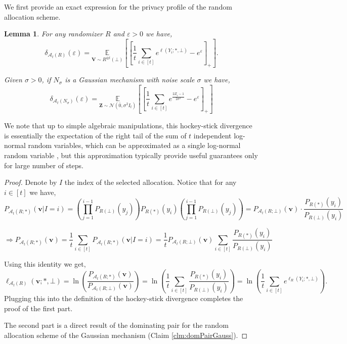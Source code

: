 \documentclass{article}
\theoremstyle{plain}
\newtheorem{lemma}[theorem]{Lemma}
\theoremstyle{definition}
\newcommand{\eps}{\varepsilon}
\newcommand{\out}{y}
\newcommand{\outRV}{Y}
\newcommand{\rand}{R}
\newcommand{\view}{\boldsymbol{v}}
\newcommand{\viewRV}{\boldsymbol{V}}
\newcommand{\expect}[2]{\underset{#1}{\mathbb{E}} \left[#2 \right]}
\newcommand{\loss}[3]{\ell\left(#1; #2, #3 \right)}
\newcommand{\lossAlg}[4]{\ell_{#1}\left(#2; #3, #4 \right)}
\newcommand{\alloc}[2]{\mathcal{A}_{#1}\left(#2\right)}
\newcommand{\allocFunc}[3]{\mathcal{A}_{#1}\left(#2; #3\right)}
\newcommand{\privProf}[1]{\delta_{#1}}
\begin{document}
We first provide an exact expression for the privacy profile of the random allocation scheme.
\begin{lemma}\label{lem:exctGauss}
    For any randomizer $\rand$ and $\eps > 0$ we have, 
    \[
        \privProf{\alloc{t}{\rand}}(\eps) = \expect{\viewRV \sim \rand^{\otimes t}(\bot)}{\left[\frac{1}{t} \sum_{i \in [t]}e^{\loss{\outRV_{i}}{*}{\bot}} - e^{\eps}  \right]_{+}}.
    \]
    
    Given $\sigma > 0$, if $N_{\sigma}$ is a Gaussian mechanism with noise scale $\sigma$ we have, 
    \[
        \privProf{\alloc{t}{N_{\sigma}}}(\eps) = \expect{\boldsymbol{Z} \sim \mathcal{N}(\bar{0}, \sigma^{2} I_{t})}{\left[\frac{1}{t} \sum_{i \in [t]} e^{\frac{2 Z_{i} - 1}{2 \sigma^{2}}} - e^{\eps} \right]_{+}}
    \]
\end{lemma}

We note that up to simple algebraic manipulations, this hockey-stick divergence is essentially the expectation of the right tail of the sum of $t$ independent log-normal random variables, which can be approximated as a single log-normal random variable \citep{MWMZ07}, but this approximation typically provide useful guarantees only for large number of steps.

\begin{proof}
    Denote by $I$ the index of the selected allocation. Notice that for any $i \in [t]$ we have, 
    \[
        P_{\allocFunc{t}{\rand}{*}}(\view \vert I=i) = \left(\prod_{j=1}^{i-1} P_{\rand(\bot)}(\out_{j}) \right) P_{\rand(*)}(\out_{i}) \left(\prod_{j=1}^{i-1} P_{\rand(\bot)}(\out_{j}) \right) = P_{\allocFunc{t}{\rand}{\bot}}(\view) \cdot \frac{P_{\rand(*)}(\out_{i})}{P_{\rand(\bot)}(\out_{i})}
    \]

    \[
        \Rightarrow P_{\allocFunc{t}{\rand}{*}}(\view) = \frac{1}{t} \sum_{i \in [t]} P_{\allocFunc{t}{\rand}{*}}(\view \vert I=i) = \frac{1}{t} P_{\allocFunc{t}{\rand}{\bot}}(\view) \sum_{i \in [t]}  \frac{P_{\rand(*)}(\out_{i})}{P_{\rand(\bot)}(\out_{i})} 
    \]
    
    Using this identity we get, 
    \[
        \lossAlg{\alloc{t}{\rand}}{\view}{*}{\bot} = \ln \left(\frac{P_{\allocFunc{t}{\rand}{*}}(\view)}{P_{\allocFunc{t}{\rand}{\bot}}(\view)} \right) = \ln \left(\frac{1}{t} \sum_{i \in [t]} \frac{P_{\rand(*)}(\out_{i})}{P_{\rand(\bot)}(\out_{i})} \right) = \ln \left(\frac{1}{t} \sum_{i \in [t]} e^{\lossAlg{\rand}{\outRV_{i}}{*}{\bot}} \right).
    \]
    Plugging this into the definition of the hockey-stick divergence completes the proof of the first part.

    The second part is a direct result of the dominating pair for the random allocation scheme of the Gaussian mechanism (Claim \ref{clm:domPairGauss}).
\end{proof}
\end{document}
